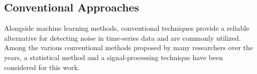 \documentclass[conference]{IEEEtran}
\begin{document}
\subsection{Conventional Approaches} Alongside machine learning methods, conventional techniques provide a reliable alternative for detecting noise in time-series data and are commonly utilized. Among the various conventional methods proposed by many researchers over the years, a statistical method and a signal-processing technique have been considered for this work.




\end{document}
